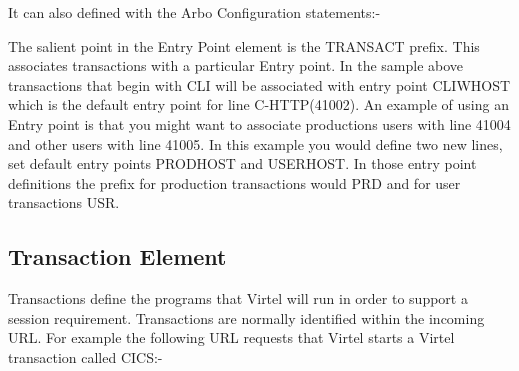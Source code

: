 \documentclass[letterpaper,10pt,english]{sphinxmanual}
\begin{document}

It can also defined with the Arbo Configuration statements:-

\begin{sphinxVerbatim}[commandchars=\\\{\}]
                                       
           
                                           
                                           
                                               
                                              
                                        
                                          
                                         
\end{sphinxVerbatim}

The salient point in the Entry Point element is the TRANSACT prefix. This associates transactions with a particular Entry point. In the sample above transactions that begin with CLI will be associated with entry point CLIWHOST which is the default entry point for line C-HTTP(41002). An example of using an Entry point is that you might want to associate productions users with line 41004 and other users with line 41005. In this example you would define two new lines, set default entry points PRODHOST and USERHOST. In those entry point definitions the prefix for production transactions would PRD and for user transactions USR.


\subsection{Transaction Element}
\label{\detokenize{connectivity_guide:transaction-element}}
Transactions define the programs that Virtel will run in order to support a session requirement. Transactions are normally identified within the incoming URL. For example the following URL requests that Virtel starts a Virtel transaction called CICS:-
\end{document}
